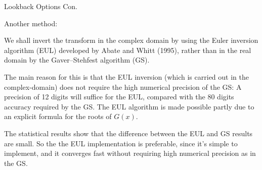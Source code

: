 \documentclass{beamer}
\begin{document}
\begin{frame}{Lookback Options Con.}


    {\footnotesize \footnotesize
    \par Another method:
    \vspace{1em}
    \par We shall invert the transform in the complex domain by using the Euler inversion algorithm
     (EUL) developed by Abate and Whitt (1995), rather than in the real domain by the Gaver--Stehfest algorithm (GS). 
    \vspace{1em}
    \par The main reason for this is that the EUL inversion (which is carried out in the complex-domain) does not require the high numerical precision of the GS: A precision of 12 digits will suffice for the EUL, compared with the 80 
    digits accuracy required by the GS. The EUL algorithm is made possible partly due to an explicit formula 
    for the roots of \( G(x) \).
    \vspace{1em}
    \par The statistical results show that the difference between the EUL and GS results are small. So the  the EUL implementation is preferable, 
    since it's simple to implement, and it converges fast without requiring high numerical precision as in the GS.
    }   
    
    
\end{frame}
\end{document}
